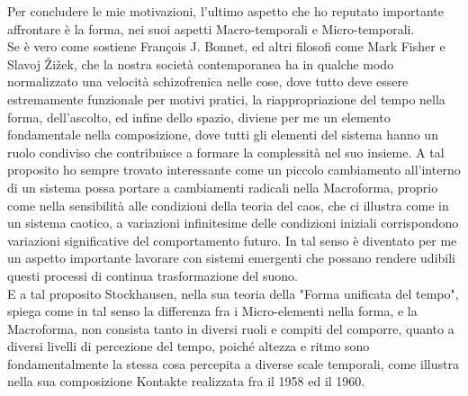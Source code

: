 Per concludere le mie motivazioni, l'ultimo aspetto che ho reputato importante affrontare è la forma,
nei suoi aspetti Macro-temporali e Micro-temporali. \\
Se è vero come sostiene François J. Bonnet, ed altri filosofi come Mark Fisher e Slavoj Žižek,
che la nostra società contemporanea ha in qualche modo normalizzato
una velocità schizofrenica nelle cose, dove tutto deve essere estremamente funzionale per motivi pratici,
la riappropriazione del tempo nella forma, dell'ascolto, ed infine dello spazio, diviene per me un elemento fondamentale
nella composizione,
dove tutti gli elementi del sistema hanno un ruolo condiviso che contribuisce a formare la complessità nel suo insieme.
A tal proposito ho sempre trovato interessante come un piccolo cambiamento all'interno di un sistema 
possa portare a cambiamenti radicali
nella Macroforma, proprio come nella sensibilità alle condizioni della teoria del caos, 
che ci illustra come in un sistema caotico, a variazioni infinitesime delle condizioni iniziali 
corrispondono variazioni significative del comportamento futuro. 
In tal senso è diventato per me un aspetto importante lavorare con
sistemi emergenti che possano rendere udibili questi processi di continua trasformazione
del suono. \\
E a tal proposito Stockhausen, nella sua teoria della "Forma unificata del tempo", 
spiega come in tal senso la differenza fra i Micro-elementi nella forma, 
e la Macroforma, non consista tanto in diversi ruoli e compiti del comporre,
quanto a diversi livelli di percezione del tempo, 
poiché altezza e ritmo sono fondamentalmente la stessa cosa percepita a diverse scale temporali,
come illustra nella sua composizione Kontakte realizzata fra il 1958 ed il 1960.


